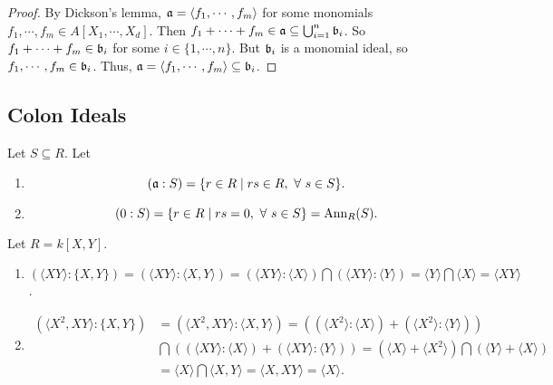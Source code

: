 \begin{proof}
     By Dickson's lemma, $\mathfrak{a} = \langle f_1,\cdots,f_m \rangle$ for some monomials $f_1,\cdots,f_m \in A[X_1,\cdots,X_d]$. Then $f_1 + \cdots + f_m \in \mathfrak{a} \subseteq \bigcup_{i=1}^n \mathfrak{b}_i$. So $f_1 + \cdots + f_m \in \mathfrak{b}_i$ for some $i \in \{1,\cdots,n\}$. But $\mathfrak{b}_i$ is a monomial ideal, so $f_1,\cdots,f_m \in \mathfrak{b}_i$. Thus, $\mathfrak{a} = \langle f_1,\cdots,f_m \rangle \subseteq \mathfrak{b}_i$.
\end{proof}


\subsection*{Colon Ideals}

\begin{definition}
    Let $S \subseteq R$. Let 
    \begin{enumerate}
        \item 
            \[(\mathfrak{a}:S) = \{r \in R \mid rs \in R, \ \forall \  s \in S\}.\]
        \item
            \[(0:S) = \{r \in R \mid rs = 0, \ \forall \  s \in S\} = \operatorname{Ann}_R(S).\]
    \end{enumerate}
\end{definition}

\begin{example}
    Let $R = k[X,Y]$. 
    \begin{enumerate}
        \item $(\langle XY \rangle: \{X,Y\}) = (\langle XY \rangle: \langle X,Y \rangle) = (\langle XY \rangle: \langle X \rangle) \bigcap (\langle XY \rangle: \langle Y \rangle) = \langle Y \rangle \bigcap \langle X \rangle= \langle XY \rangle$.
        \item
            \begin{align*}
                (\langle X^2,XY \rangle: \{X,Y\}) &= (\langle X^2,XY \rangle: \langle X,Y \rangle) = \left((\langle X^2 \rangle: \langle X \rangle) + (\langle X^2 \rangle: \langle Y \rangle)\right) \\
                &\textstyle \bigcap\left((\langle XY \rangle: \langle X \rangle)+(\langle XY \rangle: \langle Y \rangle)\right) = (\langle X \rangle + \langle X^2 \rangle) \textstyle \bigcap (\langle Y \rangle + \langle X \rangle) \\
                &= \langle X \rangle \textstyle \bigcap \langle X,Y \rangle = \langle X,XY \rangle = \langle X \rangle.
            \end{align*}
    \end{enumerate}
\end{example}

